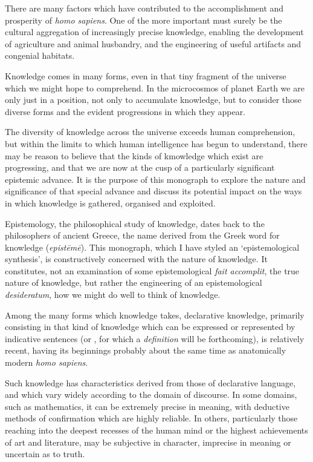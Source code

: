 There are many factors which have contributed to the accomplishment and prosperity of \emph{homo sapiens}.
One of the more important must surely be the cultural aggregation of increasingly precise knowledge, enabling the development of agriculture and animal husbandry, and the engineering of useful artifacts and congenial habitats.

Knowledge comes in many forms, even in that tiny fragment of the universe which we might hope to comprehend.
In the microcosmos of planet Earth we are only just in a position, not only to accumulate knowledge, but to consider those diverse forms and the evident progressions in which they appear.

The diversity of knowledge across the universe exceeds human comprehension, but within the limits to which human intelligence has begun to understand, there may be reason to believe that the kinds of kmowledge which exist are progressing, and that we are now at the cusp of a particularly significant epistemic advance.
It is the purpose of this monograph to explore the nature and significance of that special advance and discuss its potential impact on the ways in which knowledge is gathered, organised and exploited.

Epistemology, the philosophical study of knowledge, dates back to the phi\-lo\-so\-phers of ancient Greece, the name derived from the Greek word for knowledge 
 (\emph{epis\-tēmē}).
This monograph, which I have styled an `epistemological synthesis', is constructively concerned with the nature of knowledge.
It constitutes, not an examination of some epistemological \emph{fait accomplit}, the true nature of knowledge, but rather the engineering of an epistemological \emph{desideratum}, how we might do well to think of knowledge.

Among the many forms which knowledge takes, declarative knowledge, primarily consisting in that kind of knowledge which can be expressed or represented by indicative sentences (or , for which a \emph{definition} will be forthcoming), is relatively recent, having its beginnings probably about the same time as anatomically modern \emph{homo sapiens}.

Such knowledge has characteristics derived from those of declarative language, and which vary widely according to the domain of discourse.
In some domains, such as mathematics, it can be extremely precise in meaning, with deductive methods of confirmation which are highly reliable.
In others, particularly those reaching into the deepest recesses of the human mind or the highest achievements of art and literature, may be subjective in character, imprecise in meaning or uncertain as to truth.

